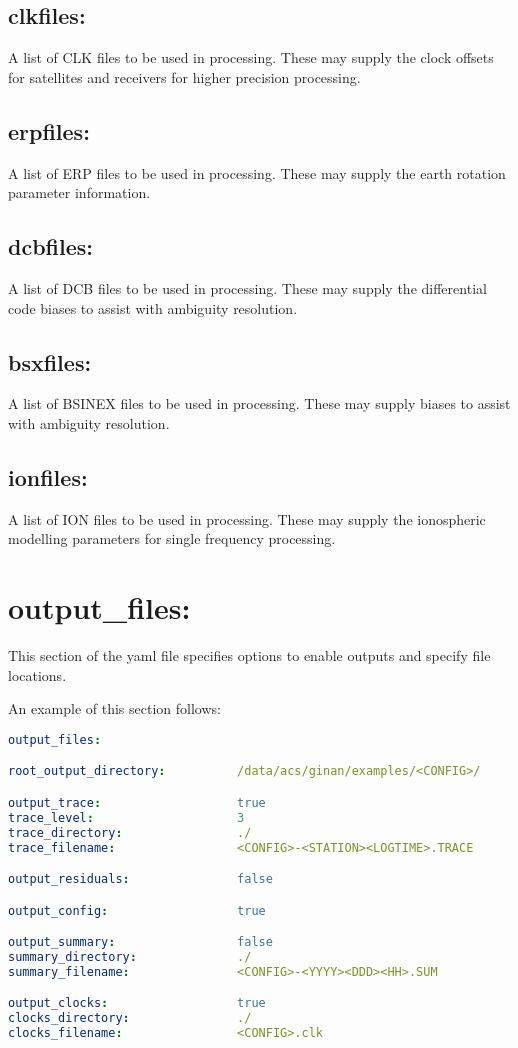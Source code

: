 \subsection{clkfiles:}
A list of CLK files to be used in processing. These may supply the clock offsets for satellites and receivers for higher precision processing.

\subsection{erpfiles:}
A list of ERP files to be used in processing. These may supply the earth rotation parameter information.

\subsection{dcbfiles:}
A list of DCB files to be used in processing. These may supply the differential code biases to assist with ambiguity resolution.

\subsection{bsxfiles:}
A list of BSINEX files to be used in processing. These may supply biases to assist with ambiguity resolution.

\subsection{ionfiles:}
A list of ION files to be used in processing. These may supply the ionospheric modelling parameters for single frequency processing.










\section{output\_files:}
This section of the yaml file specifies options to enable outputs and specify file locations.

An example of this section follows:
\begin{lstlisting}[language=yaml,caption=output\_files:]
output_files:

root_output_directory:          /data/acs/ginan/examples/<CONFIG>/

output_trace:                   true
trace_level:                    3
trace_directory:                ./
trace_filename:                 <CONFIG>-<STATION><LOGTIME>.TRACE

output_residuals:               false

output_config:                  true

output_summary:                 false
summary_directory:              ./
summary_filename:               <CONFIG>-<YYYY><DDD><HH>.SUM

output_clocks:                  true
clocks_directory:               ./
clocks_filename:                <CONFIG>.clk
\end{lstlisting}

